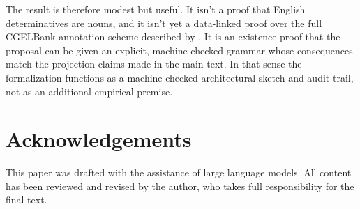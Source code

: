 \documentclass[12pt]{article}
\begin{document}
The result is therefore modest but useful. It isn't a proof that English determinatives are nouns, and it isn't yet a data-linked proof over the full CGELBank annotation scheme described by \textcite{reynolds2025cgelbankmanual}. It is an existence proof that the proposal can be given an explicit, machine-checked grammar whose consequences match the projection claims made in the main text. In that sense the formalization functions as a machine-checked architectural sketch and audit trail, not as an additional empirical premise.

\section*{Acknowledgements}

This paper was drafted with the assistance of large language models. All content has been reviewed and revised by the author, who takes full responsibility for the final text.

\newpage
\printbibliography
\end{document}
